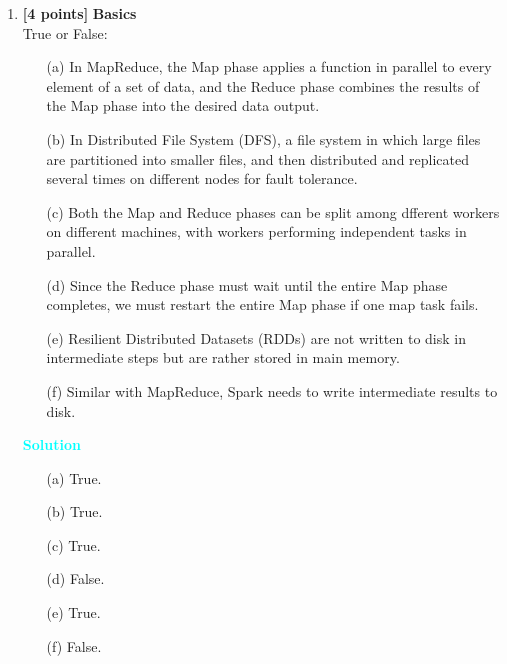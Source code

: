 \documentclass[10pt]{article}
\newenvironment{solution}
    { \begin{mdframed}[backgroundcolor=gray!10] \textcolor{cyan}{\textbf{Solution}} \\}
    {  \end{mdframed}}
\begin{document}
\begin{enumerate}

	\item \textbf{[4 points]} \textbf{Basics} \\
	      True or False:
	      \begin{itemize}
		      \item[(a)] In MapReduce, the Map phase applies a function in parallel to every element of a set of data, and the Reduce phase combines the
		            results of the Map phase into the desired data output.
		      \item[(b)] In Distributed File System (DFS), a file system in which large files are partitioned into smaller files,
		            and then distributed and replicated several times on different nodes for fault tolerance.
		      \item[(c)] Both the Map and Reduce phases can be split among dfferent
		            workers on different machines, with workers performing independent tasks in parallel.
		      \item[(d)] Since the Reduce phase must wait until the entire Map phase completes, we must restart the entire Map phase if one map task
		            fails.
		      \item[(e)] Resilient Distributed Datasets (RDDs) are not written to disk in intermediate steps but are rather stored in main memory.
		      \item[(f)] Similar with MapReduce, Spark needs to write intermediate results to disk.
	      \end{itemize}
	      \begin{solution}
		      \begin{itemize}
			      \item[(a)] True.
			      \item[(b)] True.
			      \item[(c)] True.
			      \item[(d)] False.
			      \item[(e)] True.
			      \item[(f)] False.
		      \end{itemize}
	      \end{solution}



\end{enumerate}
\end{document}
